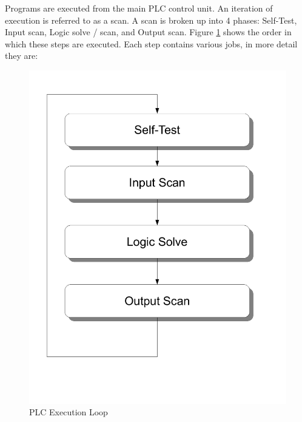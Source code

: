 \pagebreak
Programs are executed from the main PLC control unit. An iteration of execution is referred to as a scan. A scan is broken up into 4 phases: Self-Test, Input scan, Logic solve / scan, and Output scan. Figure \ref{fig:plcexecution} shows the order in which these steps are executed. Each step contains various jobs, in more detail they are:
\begin{figure}[htp]
    \centering
    \includegraphics[width=\imgmedphoto]{./images/plcexecution.pdf}
    \caption{PLC Execution Loop}
    \label{fig:plcexecution}
\end{figure}

